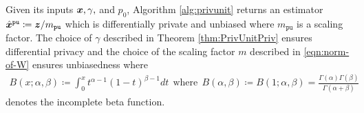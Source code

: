 Given its inputs ${\boldsymbol{x}}, \gamma,$ and $p_0$, Algorithm \ref{alg:privunit} returns an estimator $\hat{{\boldsymbol{x}}}^{\texttt{pu}} \coloneqq {\boldsymbol{z}}/m_{\texttt{pu}}$ which is differentially private and unbiased where $m_{\texttt{pu}}$ is a scaling factor. The choice of $\gamma$ described in Theorem \ref{thm:PrivUnitPriv} ensures differential privacy and the choice of the scaling factor $m$ described in \eqref{eqn:norm-of-W} ensures unbiasedness where
\begin{align}
  B(x;\alpha,\beta) \coloneqq \int_{0}^x
  t^{\alpha - 1} (1- t)^{\beta-1}dt
  ~~ \mbox{where} ~~
  B(\alpha,\beta) \coloneqq
  B(1;\alpha,\beta) = \frac{\Gamma(\alpha)
    \Gamma(\beta)}{\Gamma(\alpha+\beta)} \label{eq:incomplete_beta}
\end{align}
denotes the incomplete beta function. 


